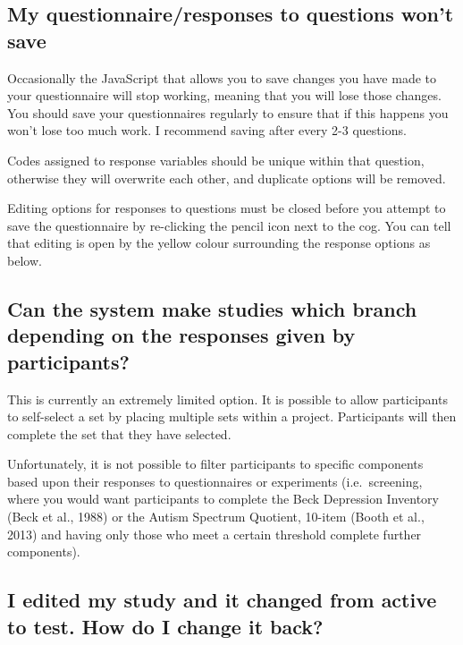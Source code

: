 \documentclass[]{book}
\begin{document}
\subsection*{My questionnaire/responses to questions won't
save}\label{my-questionnaireresponses-to-questions-wont-save}

Occasionally the JavaScript that allows you to save changes you have
made to your questionnaire will stop working, meaning that you will lose
those changes. You should save your questionnaires regularly to ensure
that if this happens you won't lose too much work. I recommend saving
after every 2-3 questions.

Codes assigned to response variables should be unique within that
question, otherwise they will overwrite each other, and duplicate
options will be removed.

Editing options for responses to questions must be closed before you
attempt to save the questionnaire by re-clicking the pencil icon next to
the cog. You can tell that editing is open by the yellow colour
surrounding the response options as below.

\subsection*{Can the system make studies which branch depending on the
responses given by
participants?}\label{can-the-system-make-studies-which-branch-depending-on-the-responses-given-by-participants}

This is currently an extremely limited option. It is possible to allow
participants to self-select a set by placing multiple sets within a
project. Participants will then complete the set that they have
selected.

Unfortunately, it is not possible to filter participants to specific
components based upon their responses to questionnaires or experiments
(i.e.~screening, where you would want participants to complete the Beck
Depression Inventory (Beck et al., 1988) or the Autism Spectrum
Quotient, 10-item (Booth et al., 2013) and having only those who meet a
certain threshold complete further components).

\subsection*{I edited my study and it changed from active to test. How
do I change it
back?}\label{i-edited-my-study-and-it-changed-from-active-to-test.-how-do-i-change-it-back}
\end{document}

